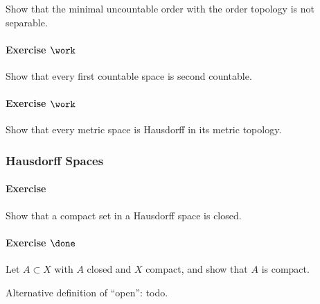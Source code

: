 Show that the minimal uncountable order with the order topology is not
separable.

\hypertarget{exercise-work-37}{%
\paragraph{\texorpdfstring{Exercise
\(\work\)}{Exercise \textbackslash work}}\label{exercise-work-37}}

Show that every first countable space is second countable.

\hypertarget{exercise-work-38}{%
\paragraph{\texorpdfstring{Exercise
\(\work\)}{Exercise \textbackslash work}}\label{exercise-work-38}}

Show that every metric space is Hausdorff in its metric topology.

\hypertarget{hausdorff-spaces}{%
\subsubsection{Hausdorff Spaces}\label{hausdorff-spaces}}

\hypertarget{exercise}{%
\paragraph{Exercise}\label{exercise}}

Show that a compact set in a Hausdorff space is closed.

\hypertarget{exercise-done-2}{%
\paragraph{\texorpdfstring{Exercise
\(\done\)}{Exercise \textbackslash done}}\label{exercise-done-2}}

Let \(A\subset X\) with \(A\) closed and \(X\) compact, and show that
\(A\) is compact.

\begin{concept}

Alternative definition of ``open'': todo.

\end{concept}

